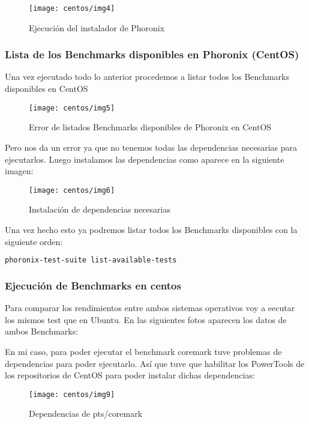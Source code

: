 \begin{figure}[H]
    \centering
    \texttt{[image: centos/img4]}
    \caption{Ejecución del instalador de Phoronix}
\end{figure}

\newpage
\subsubsection{Lista de los Benchmarks disponibles en Phoronix (CentOS)}

Una vez ejecutado todo lo anterior procedemos a listar todos los Benchmarks disponibles en CentOS

\begin{figure}[H]
    \centering
    \texttt{[image: centos/img5]}
    \caption{Error de listados Benchmarks disponibles de Phoronix en CentOS}
\end{figure}

Pero nos da un error ya que no tenemos todas las dependencias necesarias para ejecutarlos. Luego instalamos las dependencias como aparece en la siguiente imagen:

\begin{figure}[H]
    \centering
    \texttt{[image: centos/img6]}
    \caption{Instalación de dependencias necesarias}
\end{figure}

Una vez hecho esto ya podremos listar todos los Benchmarks disponibles con la siguiente orden:

\begin{lstlisting}[language=bash]
    phoronix-test-suite list-available-tests
\end{lstlisting}

\newpage
\subsubsection{Ejecución de Benchmarks en centos}

Para comparar los rendimientos entre ambos sistemas operativos voy a eecutar los mismos test que en Ubuntu. En las siguientes fotos aparecen los datos de ambos Benchmarks:

En mi caso, para poder ejecutar el benchmark coremark tuve problemas de dependencias para poder ejecutarlo. Así que tuve que habilitar los PowerTools de los repositorios de CentOS para poder instalar dichas dependencias:

\begin{figure}[H]
    \centering
    \texttt{[image: centos/img9]}
    \caption{Dependencias de pts/coremark}
\end{figure}


